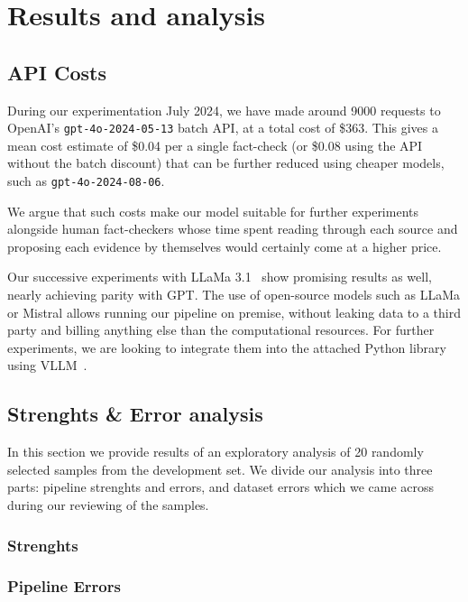 
\section{Results and analysis}
\label{sec:results}



\subsection{API Costs}
During our experimentation July 2024, we have made around 9000 requests to OpenAI's \texttt{gpt-4o-2024-05-13} batch API, at a total cost of \$363.
This gives a mean cost estimate of \$0.04 per a single fact-check (or \$0.08 using the API without the batch discount) that can be further reduced using cheaper models, such as \texttt{gpt-4o-2024-08-06}.

We argue that such costs make our model suitable for further experiments alongside human fact-checkers whose time spent reading through each source and proposing each evidence by themselves would certainly come at a higher price.

Our successive experiments with LLaMa 3.1~\cite{meta2024llama31} show promising results as well, nearly achieving parity with GPT.
The use of open-source models such as LLaMa or Mistral allows running our pipeline on premise, without leaking data to a third party and billing anything else than the computational resources.
For further experiments, we are looking to integrate them into the attached Python library using VLLM~\cite{vllm}.

\subsection{Strenghts \& Error analysis}
In this section we provide results of an exploratory analysis of 20 randomly selected samples from the development set. We divide our analysis into three parts: pipeline strenghts and errors, and dataset errors which we came across during our reviewing of the samples.

\subsubsection*{Strenghts}
\subsubsection*{Pipeline Errors}
